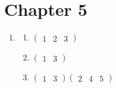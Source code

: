 \section*{Chapter 5}
\begin{enumerate}
    \item \begin{enumerate}[label=(\alph*)]
        \item $\begin{pmatrix}1 & 2 & 3\end{pmatrix}$
        \item $\begin{pmatrix}1 & 3\end{pmatrix}$
        \item $\begin{pmatrix}1 & 3\end{pmatrix}\begin{pmatrix}2 & 4 & 5\end{pmatrix}$
    \end{enumerate}


\end{enumerate}

